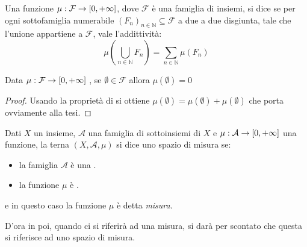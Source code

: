 \begin{definition}[{\sigadd[ità]}]
	Una funzione $\mu:\mathcal F\to [0,+\infty]$, dove $\mathcal F$ è una famiglia di insiemi, si dice \sigadd{} se per ogni sottofamiglia numerabile $(F_n)_{n\in\mathbb N}\subseteq \mathcal F$ a due a due disgiunta, tale che l'unione appartiene a $\mathcal F$, vale l'addittività:
	\begin{equation*}
		\mu\left(\bigcup_{n\in\mathbb N}F_n \right)=\sum_{n\in\mathbb N} \mu(F_n) 
	\end{equation*}
\end{definition}
\begin{remark}
	Data $\mu:\mathcal F\to [0,+\infty]$ \sigadd{}, se $\emptyset\in \mathcal F$ allora $\mu(\emptyset)=0$
\end{remark}
\begin{proof}
	Usando la proprietà di \sigadd[ità] si ottiene $\mu(\emptyset)=\mu(\emptyset)+\mu(\emptyset)$ che porta ovviamente alla tesi.
\end{proof}


\begin{definition}
	Dati $X$ un insieme, $\mathcal A$ una famiglia di sottoinsiemi di $X$ e $\mu:\mathcal A\to [0,+\infty]$ una funzione, la terna $(X,\mathcal A, \mu)$ si dice uno spazio di misura se:
	\begin{itemize}
		\item la famiglia $\mathcal A$ è una \sigalg{}.
		\item la funzione $\mu$ è \sigadd{}.
	\end{itemize}
	e in questo caso la funzione $\mu$ è detta \emph{misura}.
\end{definition}

D'ora in poi, quando ci si riferirà ad una misura, si darà per scontato che questa si riferisce ad uno spazio di misura.

